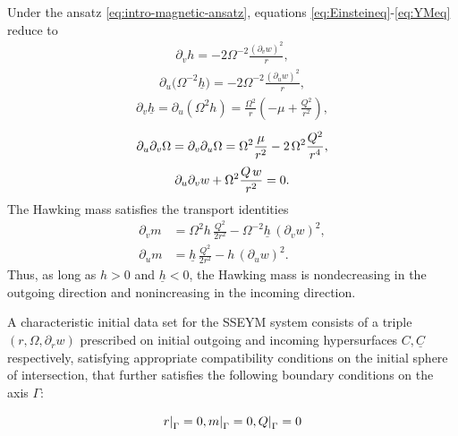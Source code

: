 \documentclass{article}[11pt]
\newcommand{\hsp}{\hspace{.5mm}}
\newcommand\restri[2]{{%
		\left.\kern-\nulldelimiterspace %
		#1 %
		\right|_{#2} %
}}
\numberwithin{equation}{section}
\begin{document}
\noindent Under the ansatz \eqref{eq:intro-magnetic-ansatz}, equations
\eqref{eq:Einsteineq}-\eqref{eq:YMeq} reduce to
\begin{align}
    \partial_v h
    =
    -2\Omega^{-2}
       \frac{(\partial_v w)^2}{r},
    \label{eq:intro-Raychaudhuri-v}
    \end{align}
    \begin{align}
    \partial_u\bigl(\Omega^{-2}\underline h\bigr)
    =
    -2\Omega^{-2}
       \frac{(\partial_u w)^2}{r},
    \label{eq:intro-Raychaudhuri-u}
    \end{align}
    \begin{align} \partial_v\underline h
    =
    \partial_u(\Omega^2h)
    =
    \frac{\Omega^2}{r}
    \left(
        -\mu+\frac{Q^2}{r^2}
    \right),
    \label{eq:intro-cross-focusing}
    \end{align}
    \begin{align}
    \partial_u \partial_v \Omega = \partial_v \partial_u \Omega = \Omega^2 \frac{\mu}{r^2}- 2 \hsp \Omega^2 \frac{Q^2}{r^4}, \label{eq:intro-Omegaequation} \end{align}
    \begin{align}
    \partial_u\partial_v w
    +
    \Omega^2\frac{Q\hsp w}{r^2}
    =0.
    \label{eq:intro-YM-wave}
\end{align}
The Hawking mass satisfies the transport identities
\begin{align}
    \partial_v m
    &=
    \Omega^2h\,\frac{Q^2}{2r^2}
    -
    \Omega^{-2}\underline h\,(\partial_vw)^2,
    \label{eq:intro-mass-v}
    \\
    \partial_u m
    &=
    \underline h\,\frac{Q^2}{2r^2}
    -
    h\,(\partial_uw)^2.
    \label{eq:intro-mass-u}
\end{align}
Thus, as long as \(h>0\) and \(\underline h< 0\), the Hawking mass is
nondecreasing in the outgoing direction and nonincreasing in the incoming
direction. 

\vspace{3mm}

\par \noindent A characteristic initial data set for the SSEYM system consists of a triple $(r,\Omega, \partial_r w)$ prescribed on initial outgoing and incoming hypersurfaces $C, \underline{C}$ respectively, satisfying appropriate compatibility conditions on the initial sphere of intersection,  that further satisfies the following boundary conditions on the axis $\Gamma$:

\[ \restri{r}{\Gamma}=0,\restri{m}{\Gamma}=0 , \restri{Q}{\Gamma}=0    \]
\end{document}
